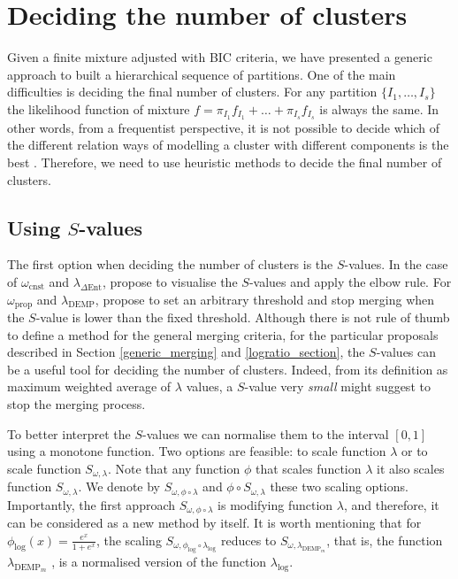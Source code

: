 \documentclass[submit]{smj}
\theoremstyle{definition}
\begin{document}
\section{Deciding the number of clusters}\label{number_clusters}

Given a finite mixture adjusted with BIC criteria, we have presented a generic approach to built a hierarchical sequence of partitions. One of the main difficulties is deciding the final number of clusters. For any partition $\{I_1, \dots, I_{s}\}$ the likelihood function of mixture $f = \pi_{I_1} f_{I_1} + \dots + \pi_{I_s} f_{I_s}$ is always the same. In other words, from a frequentist perspective, it is not possible to decide which of the different relation ways of modelling a cluster with different components is the best  \citep{hennig2010methods}. Therefore, we need to use heuristic methods to decide the final number of clusters.

\subsection{Using $S$-values}

The first option when deciding the number of clusters is the $S$-values. In the case of $\omega_{\text{cnst}}$ and $\lambda_{\Delta\text{Ent}}$, \cite{baudry2010combining} propose to visualise the $S$-values and apply the elbow rule. For $\omega_{\text{prop}}$ and $\lambda_{\text{DEMP}}$, \cite{hennig2010methods} propose to set an arbitrary threshold and stop merging when the $S$-value is lower than the fixed threshold. Although there is not rule of thumb to define a method for the general merging criteria, for the particular proposals described in Section \ref{generic_merging} and \ref{logratio_section}, the $S$-values can be a useful tool for deciding the number of clusters. Indeed, from its definition as maximum weighted average of $\lambda$ values, a $S$-value very \emph{small} might suggest to stop the merging process.

To better interpret the $S$-values we can normalise them to the interval $\left[0,1\right]$ using a monotone function. Two options are feasible: to scale function $\lambda$ or to scale function $S_{\omega, \lambda}$. Note that any function $\phi$ that scales function $\lambda$ it also scales function $S_{\omega, \lambda}$. We denote by $S_{\omega, \phi \circ \lambda}$ and $\phi \circ S_{\omega, \lambda}$ these two scaling options. Importantly, the first approach $S_{\omega, \phi \circ \lambda}$ is modifying function $\lambda$, and therefore, it can be considered as a new method by itself. It is worth mentioning that for $\phi_{\log}(x)=\frac{e^x}{1+e^x}$, the scaling $S_{\omega, \phi_{\log} \circ \lambda_{\log}}$ reduces to $S_{\omega, \lambda_{\text{DEMP}_m}}$, that is, the  function $\lambda_{\text{DEMP}_m}$ \citep{longford2014}, is a normalised version of the function $\lambda_{\log}$.
\end{document}

